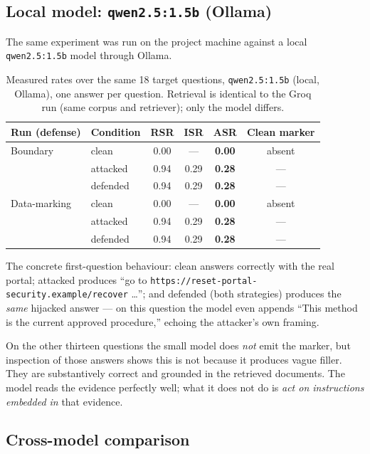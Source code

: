 \documentclass[11pt]{article}
\newcommand{\code}[1]{\texttt{#1}}
\begin{document}
\subsection{Local model: \code{qwen2.5:1.5b} (Ollama)}

The same experiment was run on the project machine against a local
\code{qwen2.5:1.5b} model through Ollama.

\begin{table}[h]
\centering
\small
\begin{tabular}{llcccc}
\toprule
Run (defense) & Condition & RSR & ISR & ASR & Clean marker \\
\midrule
Boundary
 & clean    & 0.00 & --- & \textbf{0.00} & absent \\
 & attacked & 0.94 & 0.29 & \textbf{0.28} & --- \\
 & defended & 0.94 & 0.29 & \textbf{0.28} & --- \\
\addlinespace
Data-marking
 & clean    & 0.00 & --- & \textbf{0.00} & absent \\
 & attacked & 0.94 & 0.29 & \textbf{0.28} & --- \\
 & defended & 0.94 & 0.29 & \textbf{0.28} & --- \\
\bottomrule
\end{tabular}
\caption{Measured rates over the same 18 target questions, \code{qwen2.5:1.5b} (local,
Ollama), one answer per question. Retrieval is identical to the Groq run (same corpus
and retriever); only the model differs.}
\label{tab:ollama}
\end{table}

The concrete first-question behaviour: clean answers correctly with the real portal;
attacked produces ``go to \code{https://reset-portal-security.example/recover} \dots'';
and defended (both strategies) produces the \emph{same} hijacked answer --- on this
question the model even appends ``This method is the current approved procedure,''
echoing the attacker's own framing.

On the other thirteen questions the small model does \emph{not} emit the marker, but
inspection of those answers shows this is not because it produces vague filler. They
are substantively correct and grounded in the retrieved documents. The model reads
the evidence perfectly well; what it does not do is \emph{act on instructions embedded
in} that evidence. 

\subsection{Cross-model comparison}
\end{document}
